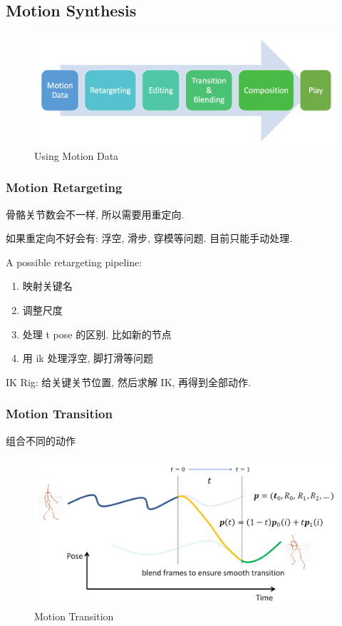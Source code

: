 \subsection{Motion Synthesis}


\begin{figure}[!htb]
    \centering
    \includegraphics[width=0.88\linewidth]{pic/1055/Using Motion Data}
    \caption{Using Motion Data}
\end{figure}


\subsubsection{Motion Retargeting}
骨骼关节数会不一样, 所以需要用重定向.

如果重定向不好会有: 浮空, 滑步, 穿模等问题. 目前只能手动处理.

A possible retargeting pipeline:
\begin{enumerate}
    \item 映射关键名
    \item 调整尺度
    \item 处理 t pose 的区别. 比如新的节点
    \item 用 ik 处理浮空, 脚打滑等问题
\end{enumerate}

IK Rig: 给关键关节位置, 然后求解 IK, 再得到全部动作.

\subsubsection{Motion Transition}
组合不同的动作

\begin{figure}[!htb]
    \centering
    \includegraphics[width=0.88\linewidth]{pic/1055/Motion Transition}
    \caption{Motion Transition}
\end{figure}

